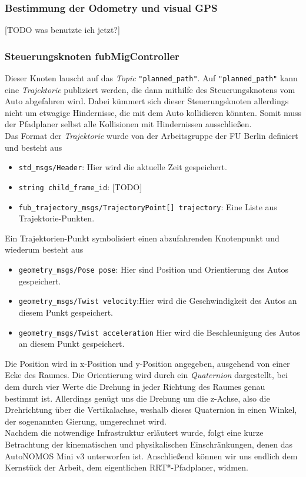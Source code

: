 \subsubsection{Bestimmung der Odometry und visual GPS}
[TODO was benutzte ich jetzt?]
\subsubsection{Steuerungsknoten fubMigController}
Dieser Knoten lauscht auf das \textit{Topic} \verb|"planned_path"|. Auf \verb|"planned_path"| kann eine \textit{Trajektorie} publiziert werden, die dann mithilfe des Steuerungsknotens vom Auto abgefahren wird. Dabei kümmert sich dieser Steuerungsknoten allerdings nicht um etwagige Hindernisse, die mit dem Auto kollidieren könnten. Somit muss der Pfadplaner selbst alle Kollisionen mit Hindernissen ausschließen. \\
Das Format der \textit{Trajektorie} wurde von der Arbeitsgruppe der FU Berlin definiert und besteht aus
\begin{itemize}
\item \verb|std_msgs/Header|: Hier wird die aktuelle Zeit gespeichert.
\item \verb|string child_frame_id|: [TODO]
\item \verb|fub_trajectory_msgs/TrajectoryPoint[] trajectory|: Eine Liste aus Trajektorie-Punkten.
\end{itemize}
Ein Trajektorien-Punkt symbolisiert einen abzufahrenden Knotenpunkt und wiederum besteht aus
\begin{itemize}
\item \verb|geometry_msgs/Pose pose|: Hier sind Position und Orientierung des Autos gespeichert.
\item \verb|geometry_msgs/Twist velocity|:Hier wird die Geschwindigkeit des Autos an diesem Punkt gespeichert.
\item \verb|geometry_msgs/Twist acceleration| Hier wird die Beschleunigung des Autos an diesem Punkt gespeichert.
\end{itemize}
Die Position wird in x-Position und y-Position angegeben, ausgehend von einer Ecke des Raumes. Die Orientierung wird durch ein \textit{Quaternion} dargestellt, bei dem durch vier Werte die Drehung in jeder Richtung des Raumes genau bestimmt ist. Allerdings genügt uns die Drehung um die z-Achse, also die Drehrichtung über die Vertikalachse, weshalb dieses Quaternion in einen Winkel, der sogenannten Gierung, umgerechnet wird.
\\
Nachdem die notwendige Infrastruktur erläutert wurde, folgt eine kurze Betrachtung der kinematischen und physikalischen Einschränkungen, denen das AutoNOMOS Mini v3 unterworfen ist. Anschließend können wir uns endlich dem Kernstück der Arbeit, dem eigentlichen RRT*-Pfadplaner, widmen.

